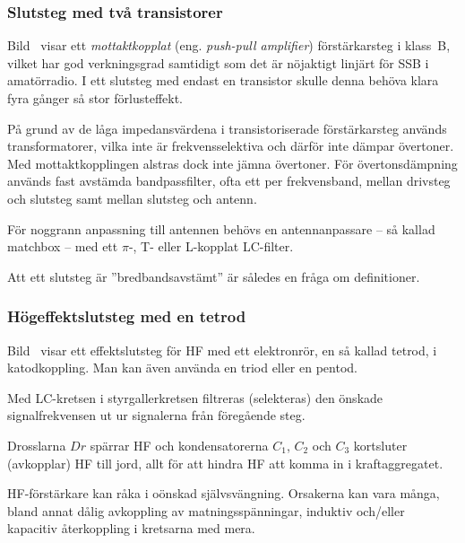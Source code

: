 \subsubsection{Slutsteg med två transistorer}


Bild~ visar ett \emph{mottaktkopplat} (eng.
\emph{push-pull amplifier}) förstärkarsteg i klass~B, vilket har god verkningsgrad
samtidigt som det är nöjaktigt linjärt för SSB i amatörradio.
I ett slutsteg med endast en transistor skulle denna behöva klara fyra gånger
så stor förlusteffekt.

På grund av de låga impedansvärdena i transistoriserade förstärkarsteg används
transformatorer, vilka inte är frekvensselektiva och därför inte dämpar
övertoner.
Med mottaktkopplingen alstras dock inte jämna övertoner.
För övertonsdämpning används fast avstämda bandpassfilter, ofta ett per
frekvensband, mellan drivsteg och slutsteg samt mellan slutsteg och antenn.

För noggrann anpassning till antennen behövs en antennanpassare --
så kallad matchbox -- med ett \(\pi \)-, T- eller L-kopplat LC-filter.

Att ett slutsteg är ''bredbandsavstämt'' är således en fråga om definitioner.

\subsubsection{Högeffektslutsteg med en tetrod}


Bild~ visar ett effektslutsteg för HF med ett elektronrör,
en så kallad tetrod, i katodkoppling.
Man kan även använda en triod eller en pentod.

Med LC-kretsen i styrgallerkretsen filtreras (selekteras) den önskade
signalfrekvensen ut ur signalerna från föregående steg.

Drosslarna \(Dr\) spärrar HF och kondensatorerna \(C_1\), \(C_2\) och
\(C_3\) kortsluter (avkopplar) HF till jord,
allt för att hindra HF att komma in i kraftaggregatet.

HF-förstärkare kan råka i oönskad självsvängning.
Orsakerna kan vara många, bland annat dålig avkoppling av matningsspänningar,
induktiv och/eller kapacitiv återkoppling i kretsarna med mera.

